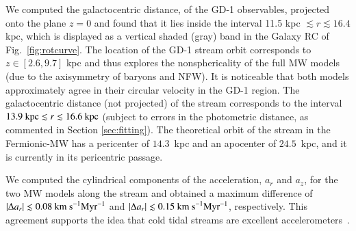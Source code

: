 \documentclass[twocolumn]{aa}
\begin{document}
We computed the galactocentric distance, of the GD-1 observables, projected onto the plane $z=0$ and found that it lies inside the interval 11.5 kpc $\lesssim r \lesssim 16.4$ kpc, which is displayed as a vertical shaded (gray) band in the Galaxy RC of Fig.~\ref{fig:rotcurve}. The location of the GD-1 stream orbit corresponds to $z\in [2.6, 9.7]$ kpc and thus explores the nonsphericality of the full MW models (due to the axisymmetry of baryons and NFW).
It is noticeable that both models approximately agree in their circular velocity in the GD-1 region.
The galactocentric distance (not projected) of the stream corresponds to the interval $13.9~\textrm{kpc} \lesssim r \lesssim 16.6~\rm{kpc}$ (subject to errors in the photometric distance, as commented in Section \ref{sec:fitting}). The theoretical orbit of the stream in the Fermionic-MW has a pericenter of $14.3$~kpc and an apocenter of $24.5$~kpc, and it is currently in its pericentric passage.

We computed the cylindrical components of the acceleration, $a_r$ and $a_z$,
for the two MW models along the stream and obtained a maximum difference of $|\Delta a_r| \lesssim 0.08 \rm{~km~s}^{-1} \rm{Myr}^{-1}$ and $|\Delta a_r| \lesssim 0.15 \rm{~km~s}^{-1} \rm{Myr}^{-1}$, respectively. This agreement supports  the idea that cold tidal streams are excellent accelerometers~\citep{Ibata_2016,2022ApJ...940...22N,2023ApJ...945L..32C}.
\end{document}
